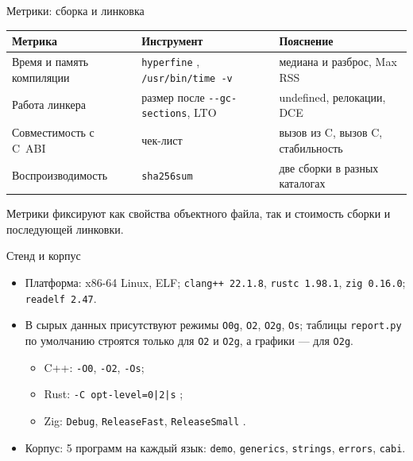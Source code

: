 \documentclass[aspectratio=169,11pt]{beamer}
\begin{document}
\begin{frame}{Метрики: сборка и линковка}
  \small
  \begin{center}
    \begin{tabularx}{0.98\textwidth}{lYY}
      \toprule
      Метрика                       & Инструмент                                              & Пояснение                    \\
      \midrule
      Время и память компиляции     & \texttt{hyperfine} \cite{hyperfine}, \texttt{/usr/bin/time -v} & медиана и разброс, Max RSS \\
      Работа линкера                & размер после \texttt{-{}-gc-sections}, LTO \cite{taylor} & undefined, релокации, DCE    \\
      Совместимость с C~ABI         & чек-лист                                                & вызов из C, вызов C, стабильность \\
      Воспроизводимость             & \texttt{sha256sum}                                      & две сборки в разных каталогах \\
      \bottomrule
    \end{tabularx}
  \end{center}
  \smallskip
  Метрики фиксируют как свойства объектного файла, так и стоимость сборки и последующей линковки.
\end{frame}

\begin{frame}{Стенд и корпус}
  \begin{itemize}
    \item Платформа: x86-64 Linux, ELF; \texttt{clang++ 22.1.8}, \texttt{rustc 1.98.1}, \texttt{zig 0.16.0}; \texttt{readelf 2.47}.
    \item В сырых данных присутствуют режимы \texttt{O0g}, \texttt{O2}, \texttt{O2g}, \texttt{Os}; таблицы \texttt{report.py} по умолчанию строятся только для \texttt{O2} и \texttt{O2g}, а графики --- для \texttt{O2g}.
    \begin{itemize}
      \item C++: \texttt{-O0}, \texttt{-O2}, \texttt{-Os};
      \item Rust: \texttt{-C opt-level=0|2|s} \cite{rustcbook};
      \item Zig: \texttt{Debug}, \texttt{ReleaseFast}, \texttt{ReleaseSmall} \cite{zigdoc}.
    \end{itemize}
    \item Корпус: 5 программ на каждый язык: \texttt{demo}, \texttt{generics}, \texttt{strings}, \texttt{errors}, \texttt{cabi}.
  \end{itemize}
\end{frame}
\end{document}
